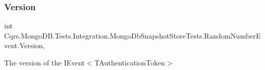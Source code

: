 \subsubsection{\texorpdfstring{Version}{Version}}
{\footnotesize\ttfamily int Cqrs.\+Mongo\+D\+B.\+Tests.\+Integration.\+Mongo\+Db\+Snapshot\+Store\+Tests.\+Random\+Number\+Event.\+Version\hspace{0.3cm}{\ttfamily [get]}, {\ttfamily [set]}}



The version of the I\+Event$<$\+T\+Authentication\+Token$>$ 


